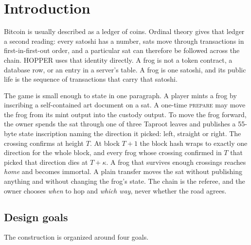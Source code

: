\section{Introduction}\label{sec:introduction}

Bitcoin \cite{bitcoin} is usually described as a ledger of coins. Ordinal theory gives that
ledger a second reading: every satoshi has a number, sats move through
transactions in first-in-first-out order, and a particular sat can therefore
be followed across the chain. HOPPER uses that identity directly. A frog is
not a token contract, a database row, or an entry in a server's table. A frog
is one satoshi, and its public life is the sequence of transactions that
carry that satoshi.

The game is small enough to state in one paragraph. A player mints a frog by
inscribing a self-contained art document on a sat. A one-time \textsc{prepare}
may move the frog from its mint output into the custody output. To move the
frog forward, the owner spends the sat through one of three Taproot leaves and
publishes a 55-byte state inscription naming the direction it picked: left,
straight or right. The crossing confirms at height $T$. At block $T+1$ the
block hash wraps to exactly one direction for the whole block, and every
frog whose crossing confirmed in $T$ that picked that direction dies at
$T+\kappa$. A frog that survives enough crossings reaches \emph{home} and
becomes immortal. A plain transfer moves the sat without publishing anything
and without changing the frog's state. The chain is the referee, and the
owner chooses \emph{when} to hop and \emph{which way}, never whether the road
agrees.

\subsection{Design goals}

The construction is organized around four goals.

